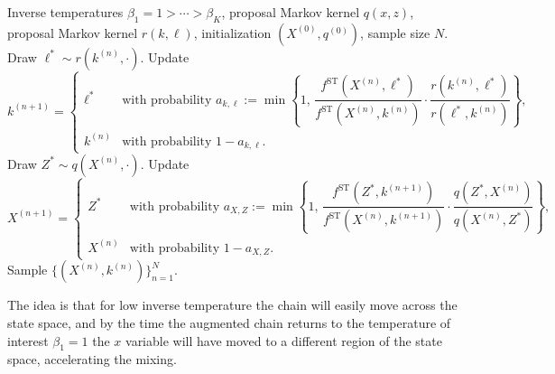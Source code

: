 \begin{algorithm}[H]
\caption{Simulated Tempering}
\label{alg:7.2}
\begin{algorithmic}[1]
\Require Inverse temperatures $\beta_1 = 1 > \cdots > \beta_K$, proposal Markov kernel
  $q(x, z)$, proposal Markov kernel $r(k, \ell)$, initialization $(X^{(0)}, q^{(0)})$,
  sample size $N$.
  \State Draw $\ell^* \sim r(k^{(n)}, \cdot)$.
  \State Update
    \[
      k^{(n+1)} =
      \begin{cases}
        \ell^*   & \text{with probability } a_{k,\ell} := \min\!\left\{1,\,
                   \dfrac{f^{\mathrm{ST}}(X^{(n)}, \ell^*)}{f^{\mathrm{ST}}(X^{(n)}, k^{(n)})}
                   \cdot \dfrac{r(k^{(n)}, \ell^*)}{r(\ell^*, k^{(n)})}\right\}, \\[6pt]
        k^{(n)} & \text{with probability } 1 - a_{k,\ell}.
      \end{cases}
    \]
  \State Draw $Z^* \sim q(X^{(n)}, \cdot)$.
  \State Update
    \[
      X^{(n+1)} =
      \begin{cases}
        Z^*      & \text{with probability } a_{X,Z} := \min\!\left\{1,\,
                   \dfrac{f^{\mathrm{ST}}(Z^*, k^{(n+1)})}{f^{\mathrm{ST}}(X^{(n)}, k^{(n+1)})}
                   \cdot \dfrac{q(Z^*, X^{(n)})}{q(X^{(n)}, Z^*)}\right\}, \\[6pt]
        X^{(n)} & \text{with probability } 1 - a_{X,Z}.
      \end{cases}
    \]
\EndFor
\Ensure Sample $\{(X^{(n)}, k^{(n)})\}_{n=1}^N$.
\end{algorithmic}
\end{algorithm}

The idea is that for low inverse temperature the chain will easily move across the state space,
and by the time the augmented chain returns to the temperature of interest $\beta_1 = 1$ the
$x$ variable will have moved to a different region of the state space, accelerating the mixing.

\begin{center}
\end{center}

